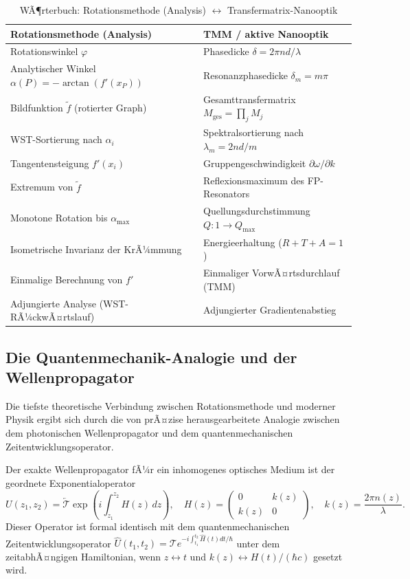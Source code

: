 ﻿\documentclass[12pt, a4paper]{article}
\theoremstyle{definition}
\begin{document}
	\begin{table}[H]
		\centering
		\caption{WÃ¶rterbuch: Rotationsmethode (Analysis) $\leftrightarrow$ Transfermatrix-Nanooptik}
		\renewcommand{\arraystretch}{1.4}
		\begin{tabular}{ll}
			\toprule
			\textbf{Rotationsmethode (Analysis)} & \textbf{TMM / aktive Nanooptik \cite{oqtum}} \\
			\midrule
			Rotationswinkel $\varphi$ & Phasedicke $\delta = 2\pi n d / \lambda$ \\
			Analytischer Winkel $\alpha(P) = -\arctan(f'(x_P))$ & Resonanzphasedicke $\delta_m = m\pi$ \\
			Bildfunktion $\tilde{f}$ (rotierter Graph) & Gesamttransfermatrix $M_\mathrm{ges} = \prod_j M_j$ \\
			WST-Sortierung nach $\alpha_i$ & Spektralsortierung nach $\lambda_m = 2nd/m$ \\
			Tangentensteigung $f'(x_i)$ & Gruppengeschwindigkeit $\partial\omega/\partial k$ \\
			Extremum von $\tilde{f}$ & Reflexionsmaximum des FP-Resonators \\
			Monotone Rotation bis $\alpha_\mathrm{max}$ & Quellungsdurchstimmung $Q: 1 \to Q_\mathrm{max}$ \\
			Isometrische Invarianz der KrÃ¼mmung & Energieerhaltung ($R + T + A = 1$) \\
			Einmalige Berechnung von $f'$ & Einmaliger VorwÃ¤rtsdurchlauf (TMM) \\
			Adjungierte Analyse (WST-RÃ¼ckwÃ¤rtslauf) & Adjungierter Gradientenabstieg \cite{oqtum} \\
			\bottomrule
		\end{tabular}
	\end{table}
	
	\subsection{Die Quantenmechanik-Analogie und der Wellenpropagator}
	
	Die tiefste theoretische Verbindung zwischen Rotationsmethode und moderner
	Physik ergibt sich durch die von \cite{oqtum} prÃ¤zise herausgearbeitete
	Analogie zwischen dem photonischen Wellenpropagator und dem
	quantenmechanischen Zeitentwicklungsoperator.
	
	Der exakte Wellenpropagator fÃ¼r ein inhomogenes optisches Medium ist der
	geordnete Exponentialoperator
	\[
	U(z_1, z_2) = \overleftarrow{\mathcal{T}}\exp\!\left(
	i\int_{z_1}^{z_2} H(z)\,dz
	\right), \quad
	H(z) = \begin{pmatrix}0 & k(z) \\ k(z) & 0\end{pmatrix},
	\quad k(z) = \frac{2\pi n(z)}{\lambda}.
	\]
	Dieser Operator ist formal identisch mit dem quantenmechanischen
	Zeitentwicklungsoperator $\hat{U}(t_1, t_2) = \mathcal{T}e^{-i\int_{t_1}^{t_2}\hat{H}(t)dt/\hbar}$
	unter dem zeitabhÃ¤ngigen Hamiltonian, wenn $z \leftrightarrow t$ und
	$k(z) \leftrightarrow H(t)/(\hbar c)$ gesetzt wird.
	
\end{document}
